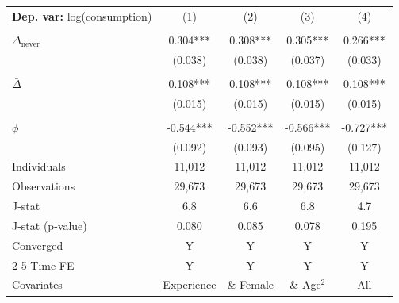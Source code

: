\begin{tabular}{l cccc} \toprule  \textbf{Dep. var:}  log(consumption) 
                    &\multicolumn{1}{c}{(1)}   &\multicolumn{1}{c}{(2)}   &\multicolumn{1}{c}{(3)}   &\multicolumn{1}{c}{(4)}   \\
                    &               &               &               &               \\
\addlinespace
$\Delta_{\text{never}}$&       0.304***&       0.308***&       0.305***&       0.266***\\
                    &     (0.038)   &     (0.038)   &     (0.037)   &     (0.033)   \\
                    &               &               &               &               \\
\addlinespace
$\bar{\Delta}$      &       0.108***&       0.108***&       0.108***&       0.108***\\
                    &     (0.015)   &     (0.015)   &     (0.015)   &     (0.015)   \\
                    &               &               &               &               \\
\addlinespace
$\phi$              &      -0.544***&      -0.552***&      -0.566***&      -0.727***\\
                    &     (0.092)   &     (0.093)   &     (0.095)   &     (0.127)   \\
\addlinespace
Individuals         &      11,012   &      11,012   &      11,012   &      11,012   \\
Observations        &      29,673   &      29,673   &      29,673   &      29,673   \\
J-stat              &         6.8   &         6.6   &         6.8   &         4.7   \\
J-stat (p-value)    &       0.080   &       0.085   &       0.078   &       0.195   \\
Converged           &           Y   &           Y   &           Y   &           Y   \\
\cmidrule{2-5} Time FE & Y & Y & Y & Y \\ Covariates & Experience & \& Female & \& Age$^2$ & All \\ \bottomrule \end{tabular}
